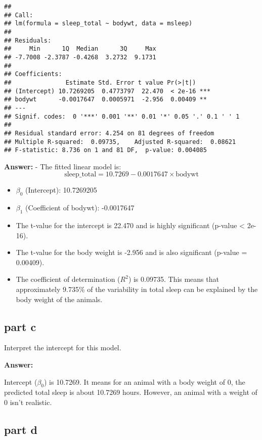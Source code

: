 \documentclass[
]{article}
\begin{document}
\begin{verbatim}
## 
## Call:
## lm(formula = sleep_total ~ bodywt, data = msleep)
## 
## Residuals:
##     Min      1Q  Median      3Q     Max 
## -7.7008 -2.3787 -0.4268  3.2732  9.1731 
## 
## Coefficients:
##               Estimate Std. Error t value Pr(>|t|)    
## (Intercept) 10.7269205  0.4773797  22.470  < 2e-16 ***
## bodywt      -0.0017647  0.0005971  -2.956  0.00409 ** 
## ---
## Signif. codes:  0 '***' 0.001 '**' 0.01 '*' 0.05 '.' 0.1 ' ' 1
## 
## Residual standard error: 4.254 on 81 degrees of freedom
## Multiple R-squared:  0.09735,    Adjusted R-squared:  0.08621 
## F-statistic: 8.736 on 1 and 81 DF,  p-value: 0.004085
\end{verbatim}

\textbf{Answer:} - The fitted linear model is: \[
  \text{{sleep\_total}} = 10.7269 - 0.0017647 \times \text{{bodywt}}
  \]

\begin{itemize}
\item
  \(\beta_0\) (Intercept): 10.7269205
\item
  \(\beta_1\) (Coefficient of bodywt): -0.0017647
\item
  The t-value for the intercept is 22.470 and is highly significant
  (p-value \textless{} 2e-16).
\item
  The t-value for the body weight is -2.956 and is also significant
  (p-value = 0.00409).
\item
  The coefficient of determination (\(R^2\)) is 0.09735. This means that
  approximately 9.735\% of the variability in total sleep can be
  explained by the body weight of the animals.
\end{itemize}

\subsection{part c}\label{part-c}

Interpret the intercept for this model.

\textbf{Answer:}

Intercept (\(\beta_0\)) is 10.7269. It means for an animal with a body
weight of 0, the predicted total sleep is about 10.7269 hours. However,
an animal with a weight of 0 isn't realistic.

\subsection{part d}\label{part-d}
\end{document}
